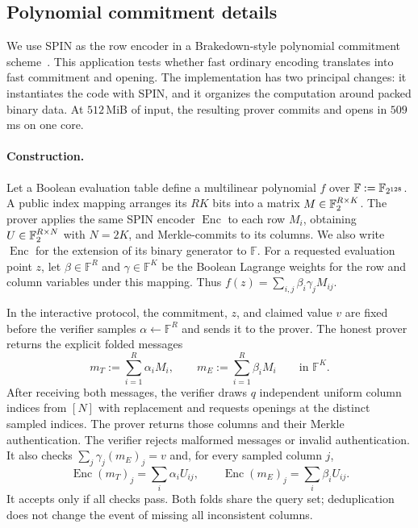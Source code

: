 \subsection{Polynomial commitment details}
\label{app:pcs-details}

We use SPIN as the row encoder in a Brakedown-style polynomial commitment
scheme~\cite{brakedown23}. This application tests whether fast ordinary
encoding translates into fast commitment and opening. The implementation
has two principal changes: it instantiates the code with SPIN, and it
organizes the computation around packed binary data. At $512$\,MiB of
input, the resulting prover commits and opens in $509$\,ms on one core.

\paragraph{Construction.}
Let a Boolean evaluation table define a multilinear polynomial $f$ over
$\mathbb F:=\mathbb F_{2^{128}}$. A public index mapping arranges its $RK$ bits
into a matrix $M\in\mathbb F_2^{R\times K}$. The prover applies the same SPIN
encoder $\operatorname{Enc}$ to each row $M_i$, obtaining
$U\in\mathbb F_2^{R\times N}$ with $N=2K$, and Merkle-commits to its columns.
We also write $\operatorname{Enc}$ for the extension of its binary generator
to $\mathbb F$.
For a requested evaluation point $z$, let $\beta\in\mathbb F^R$ and
$\gamma\in\mathbb F^K$ be the Boolean Lagrange weights for the row and
column variables under this mapping. Thus
$f(z)=\sum_{i,j}\beta_i\gamma_jM_{ij}$.

In the interactive protocol, the commitment, $z$, and claimed value $v$
are fixed before the verifier samples $\alpha\gets\mathbb F^R$ and sends
it to the prover. The honest prover returns the explicit folded messages
\[
  m_T:=\sum_{i=1}^R\alpha_i M_i,
  \qquad
  m_E:=\sum_{i=1}^R\beta_i M_i
  \qquad\text{in }\mathbb F^K.
\]
After receiving both messages, the verifier draws $q$ independent uniform
column indices from $[N]$ with replacement and requests openings at the distinct
sampled indices. The prover returns those columns and their Merkle
authentication. The verifier rejects malformed messages or invalid
authentication. It also checks $\sum_j\gamma_j(m_E)_j=v$ and, for every
sampled column $j$,
\[
  \operatorname{Enc}(m_T)_j=\sum_i\alpha_iU_{ij},
  \qquad
  \operatorname{Enc}(m_E)_j=\sum_i\beta_iU_{ij}.
\]
It accepts only if all checks pass. Both folds share the query set;
deduplication does not change the event of missing all inconsistent columns.

